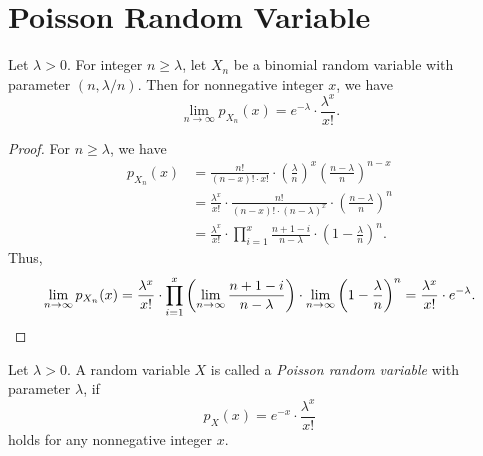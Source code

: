 \section{Poisson Random Variable}
\begin{theorem}
  Let $\lambda > 0$.
  For integer $n \geq \lambda$, let $X_n$ be a binomial random variable with
  parameter $(n, \lambda/n)$. Then for nonnegative integer $x$, we have
  \begin{equation*}
    \lim_{n \to \infty}p_{X_n}(x) = e^{-\lambda} \cdot \frac{\lambda^x}{x!}.
  \end{equation*}
\end{theorem}
\begin{proof}
  For $n \geq \lambda$, we have
  \begin{align*}
    p_{X_n}(x)
    &= \frac{n!}{(n-x)! \cdot x!} \cdot \left(\frac{\lambda}{n}\right)^x \left(\frac{n-\lambda}{n}\right)^{n-x} \\
    &= \frac{\lambda^x}{x!} \cdot \frac{n!}{(n-x)! \cdot (n-\lambda)^x} \cdot \left(\frac{n-\lambda}{n}\right)^n \\
    &= \frac{\lambda^x}{x!} \cdot \prod_{i=1}^{x} \frac{n+1-i}{n-\lambda} \cdot \left(1 - \frac{\lambda}{n}\right)^n.
  \end{align*}
  Thus,
  \begin{equation*}
    \lim_{n\to\infty} p_{X_n}(x)
    = \frac{\lambda^x}{x!} \cdot \prod_{i=1}^x \left(\lim_{n\to\infty} \frac{n+1-i}{n-\lambda}\right) \cdot \lim_{n\to\infty}\left(1 - \frac{\lambda}{n}\right)^n
    = \frac{\lambda^x}{x!} \cdot e^{-\lambda}. \qedhere
  \end{equation*}
\end{proof}

\begin{definition}
  Let $\lambda > 0$.
  A random variable $X$ is called a \emph{Poisson random variable} with
  parameter $\lambda$, if
  \begin{equation*}
    p_X(x) = e^{-x} \cdot \frac{\lambda^x}{x!}
  \end{equation*}
  holds for any nonnegative integer $x$.
\end{definition}